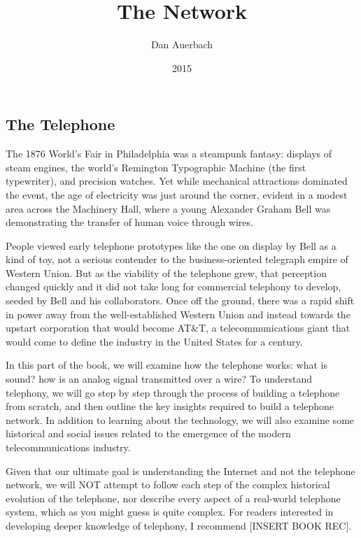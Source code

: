 \documentclass[UTF8]{book}
\begin{document}
\begin{CJK}{UTF8}{gbsn}

\title{The Network}
\author{Dan Auerbach}
\date{2015}
\maketitle

\part{The Telephone}

The 1876 World's Fair in Philadelphia was a steampunk fantasy: displays of steam engines, the world's Remington Typographic Machine (the first typewriter), and precision watches. Yet while mechanical attractions dominated the event, the age of electricity was just around the corner, evident in a modest area across the Machinery Hall, where a young Alexander Graham Bell was demonstrating the transfer of human voice through wires.

People viewed early telephone prototypes like the one on display by Bell as a kind of toy, not a serious contender to the business-oriented telegraph empire of Western Union. But as the viability of the telephone grew, that perception changed quickly and it did not take long for commercial telephony to develop, seeded by Bell and his collaborators. Once off the ground, there was a rapid shift in power away from the well-established Western Union and instead towards the upstart corporation that would become AT\&T, a telecommunications giant that would come to define the industry in the United States for a century.

In this part of the book, we will examine how the telephone works: what is sound? how is an analog signal transmitted over a wire? To understand telephony, we will go step by step through the process of building a telephone from scratch, and then outline the key insights required to build a telephone network. In addition to learning about the technology, we will also examine some historical and social issues related to the emergence of the modern telecommunications industry.

Given that our ultimate goal is understanding the Internet and not the telephone network, we will NOT attempt to follow each step of the complex historical evolution of the telephone, nor describe every aspect of a real-world telephone system, which as you might guess is quite complex. For readers interested in developing deeper knowledge of telephony, I recommend [INSERT BOOK REC].


\end{CJK}
\end{document}

